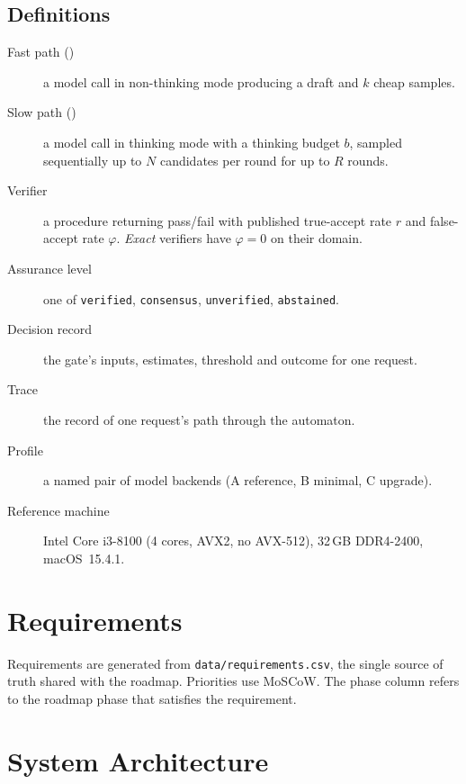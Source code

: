 \documentclass[11pt,a4paper]{article}
\begin{document}
\subsection{Definitions}
\begin{description}
\item[Fast path (\Sone)] a model call in non-thinking mode producing a draft and $k$ cheap samples.
\item[Slow path (\Stwo)] a model call in thinking mode with a thinking budget $b$, sampled sequentially up to $N$ candidates per round for up to $R$ rounds.
\item[Verifier] a procedure returning pass/fail with published true-accept rate $r$ and false-accept rate $\varphi$. \emph{Exact} verifiers have $\varphi=0$ on their domain.
\item[Assurance level] one of \texttt{verified}, \texttt{consensus}, \texttt{unverified}, \texttt{abstained}.
\item[Decision record] the gate's inputs, estimates, threshold and outcome for one request.
\item[Trace] the record of one request's path through the automaton.
\item[Profile] a named pair of model backends (A reference, B minimal, C upgrade).
\item[Reference machine] Intel Core i3-8100 (4 cores, AVX2, no AVX-512), 32\,GB DDR4-2400, macOS~15.4.1.
\end{description}

\section{Requirements}
\label{sec:req}
Requirements are generated from \texttt{data/requirements.csv}, the single source of truth shared with the roadmap. Priorities use MoSCoW. The phase column refers to the roadmap phase that satisfies the requirement.


\section{System Architecture}
\label{sec:arch}
\end{document}
